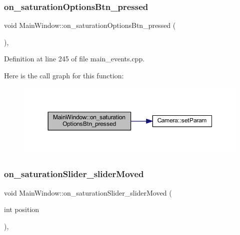 \subsubsection{\texorpdfstring{on\_saturationOptionsBtn\_pressed}{on\_saturationOptionsBtn\_pressed}}
{\footnotesize\ttfamily void Main\+Window\+::on\+\_\+saturation\+Options\+Btn\+\_\+pressed (\begin{DoxyParamCaption}{ }\end{DoxyParamCaption})\hspace{0.3cm}{\ttfamily [private]}, {\ttfamily [slot]}}



Definition at line 245 of file main\+\_\+events.\+cpp.

Here is the call graph for this function\+:
\nopagebreak
\begin{figure}[H]
\begin{center}
\leavevmode
\includegraphics[width=350pt]{class_main_window_aa663ee1d7e10715e4998923eb87e5d15_cgraph}
\end{center}
\end{figure}
\mbox{\label{class_main_window_abd0b71ebb4667aa574bfa870ade22f58}} 
\subsubsection{\texorpdfstring{on\_saturationSlider\_sliderMoved}{on\_saturationSlider\_sliderMoved}}
{\footnotesize\ttfamily void Main\+Window\+::on\+\_\+saturation\+Slider\+\_\+slider\+Moved (\begin{DoxyParamCaption}\item[{int}]{position }\end{DoxyParamCaption})\hspace{0.3cm}{\ttfamily [private]}, {\ttfamily [slot]}}



